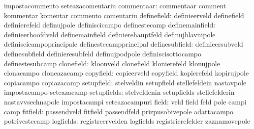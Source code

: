                                   impostacommento                  seteazacomentariu
                      commentaar: commentaar                       comment
                                  kommentar                        komentar
                                  commento                         comentariu
                     definefield: definieerveld                    definefield
                                  definierefeld                    definujpole
                                  definiscicampo                   definestecamp
                 definemainfield: definieerhoofdveld               definemainfield
                                  definierehauptfeld               definujhlavnipole
                                  definiscicampoprincipale         definestecampprincipal
                  definesubfield: definieersubveld                 definesubfield
                                  definieresubfeld                 definujpodpole
                                  definiscisottocampo              definestesubcamp
                      clonefield: kloonveld                        clonefield
                                  klonierefeld                     klonujpole
                                  clonacampo                       cloneazacamp
                       copyfield: copieerveld                      copyfield
                                  kopierefeld                      kopirujpole
                                  copiacampo                       copiazacamp
                      setupfield: stelveldin                       setupfield
                                  stellefeldein                    nastavpole
                                  impostacampo                     seteazacamp
                     setupfields: stelveldenin                     setupfields
                                  stellefelderin                   nastavvsechnapole
                                  impostacampi                     seteazacampuri
                           field: veld                             field
                                  feld                             pole
                                  campi                            camp
                        fitfield: passendveld                      fitfield
                                  passendfeld                      prizpusobivepole %
                                  adattacampo                      potrivestecamp
                       logfields: registreervelden                 logfields
                                  registrierefelder                zaznamovepole
